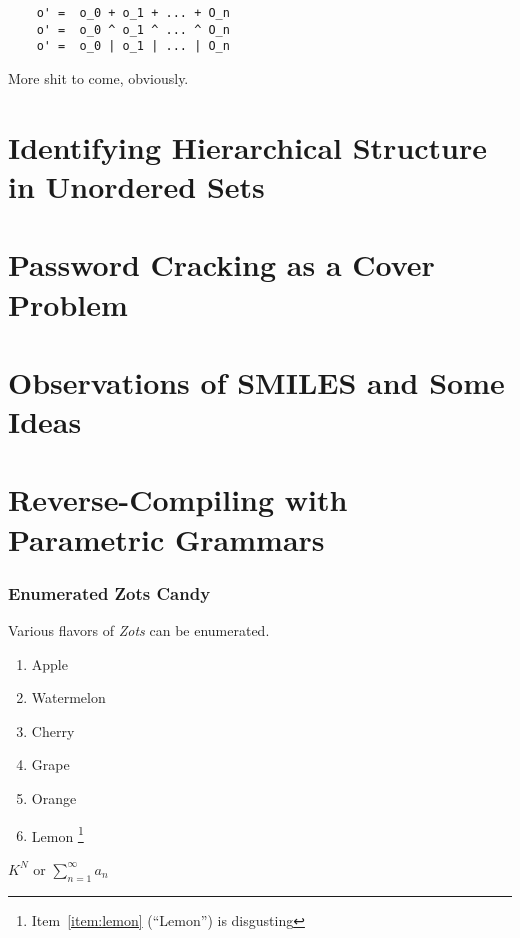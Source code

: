 \documentclass[11pt]{book}
\begin{document}
\begin{verbatim}
	o' =  o_0 + o_1 + ... + O_n
	o' =  o_0 ^ o_1 ^ ... ^ O_n
	o' =  o_0 | o_1 | ... | O_n
\end{verbatim}

More shit to come, obviously.

\chapter{Identifying Hierarchical Structure in Unordered Sets}
\chapter{Password Cracking as a Cover Problem}
\chapter{Observations of SMILES and Some Ideas}
\chapter{Reverse-Compiling with Parametric Grammars}

\subsection{Enumerated Zots Candy}

Various flavors of \emph{Zots} can be enumerated.

\begin{enumerate}
	\item Apple
	\item Watermelon
	\item Cherry
	\item Grape
	\item Orange
	\item \label{item:lemon} Lemon%
\footnote{Item~\ref{item:lemon} (``Lemon'') is disgusting}
\end{enumerate}

$K^N$ or $\displaystyle\sum^{\infty}_{n=1} a_n$
\end{document}

